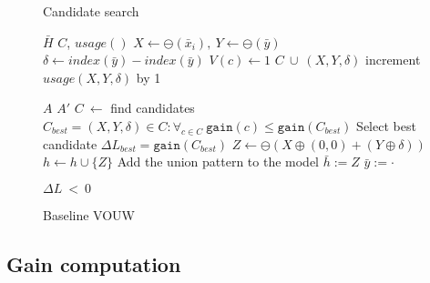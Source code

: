\documentclass{llncs}
\begin{document}
\begin{figure*}[ttt!]
\begin{minipage}[t]{.49\textwidth}
	\begin{algorithm}[H]
	\caption{Candidate search}
	\begin{algorithmic}[1]
	\Require $\bar{H}$
	\Ensure $C$, ${usage}()$
			\State $X \gets \ominus(\bar{x}_i), \ Y \gets \ominus(\bar{y})$
			\State $\delta \gets {index}(\bar{y}) - {index}(\bar{y})$
				\State $V(c) \gets 1$
			\EndIf
			\State $C \ \cup \ (X,Y,\delta)$
			\State increment ${usage}(X,Y,\delta)$ by 1
		\EndFor
	\EndFor
	\end{algorithmic}
	\end{algorithm}%
\end{minipage}%
\begin{minipage}[t]{.49\textwidth}
	\begin{algorithm}[H]
	\caption{Baseline VOUW}
	\label{alg:vouw}
	\begin{algorithmic}[1]
	\Require $A$
	\Ensure $A'$
	\Repeat
		\State $C \ \gets$ find candidates
		\State $C_{best} = (X,Y,\delta) \in C : \forall_{c \in C} \ \mathtt{gain}(c) \leq \mathtt{gain}(C_{best})$
		\Comment Select best candidate
	\State $\Delta L_{best} = \mathtt{gain}(C_{best})$
		\State $Z \gets \ominus(X\oplus(0,0) + (Y\oplus\delta))$
		\State $h \gets h \cup \{Z\}$
			\Comment Add the union pattern to the model
				\State $\bar{h} := Z$
				\State $\bar{y} := \cdot$
			\EndFor
		\EndFor
	\EndIf

	
	\Until $\Delta L \ < \ 0$
	\end{algorithmic}
	\end{algorithm}
\end{minipage}
\end{figure*}

\subsection{Gain computation}
\end{document}
